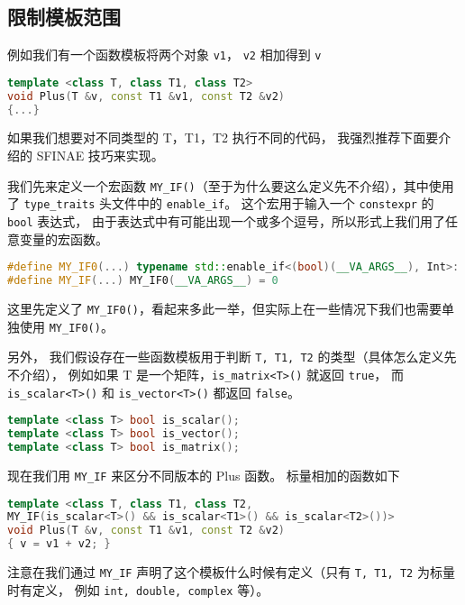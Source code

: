 
\begin{issues}
\issueMissDepend
\end{issues}

\subsection{限制模板范围}
例如我们有一个函数模板将两个对象 \verb`v1`， \verb`v2` 相加得到 \verb`v`
\begin{lstlisting}[language=cpp]
template <class T, class T1, class T2>
void Plus(T &v, const T1 &v1, const T2 &v2)
{...}
\end{lstlisting}
如果我们想要对不同类型的 T，T1，T2 执行不同的代码， 我强烈推荐下面要介绍的 SFINAE 技巧来实现。

我们先来定义一个宏函数 \verb`MY_IF()`（至于为什么要这么定义先不介绍），其中使用了 \verb`type_traits` 头文件中的 \verb`enable_if`。 这个宏用于输入一个 \verb`constexpr` 的 \verb`bool` 表达式， 由于表达式中有可能出现一个或多个逗号，所以形式上我们用了任意变量的宏函数。
\begin{lstlisting}[language=cpp]
#define MY_IF0(...) typename std::enable_if<(bool)(__VA_ARGS__), Int>::type
#define MY_IF(...) MY_IF0(__VA_ARGS__) = 0
\end{lstlisting}
这里先定义了 \verb`MY_IF0()`，看起来多此一举，但实际上在一些情况下我们也需要单独使用 \verb`MY_IF0()`。

另外， 我们假设存在一些函数模板用于判断 \verb`T, T1, T2` 的类型（具体怎么定义先不介绍）， 例如如果 T 是一个矩阵，\verb`is_matrix<T>()` 就返回 \verb`true`， 而 \verb`is_scalar<T>()` 和 \verb`is_vector<T>()` 都返回 \verb`false`。
\begin{lstlisting}[language=cpp]
template <class T> bool is_scalar();
template <class T> bool is_vector();
template <class T> bool is_matrix();
\end{lstlisting}

现在我们用 \verb`MY_IF` 来区分不同版本的 Plus 函数。 标量相加的函数如下
\begin{lstlisting}[language=cpp]
template <class T, class T1, class T2,
MY_IF(is_scalar<T>() && is_scalar<T1>() && is_scalar<T2>())>
void Plus(T &v, const T1 &v1, const T2 &v2)
{ v = v1 + v2; }
\end{lstlisting}

注意在我们通过 \verb`MY_IF` 声明了这个模板什么时候有定义（只有 \verb`T, T1, T2` 为标量时有定义， 例如 \verb`int, double, complex` 等）。

